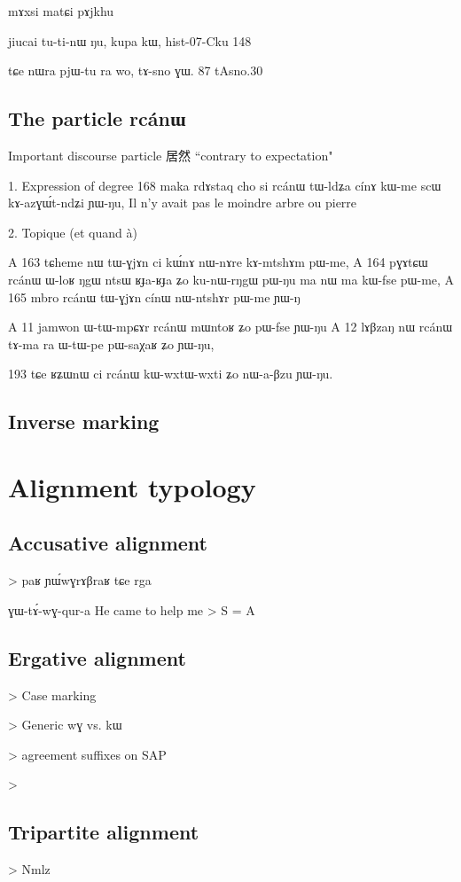 \documentclass[oldfontcommands,oneside,a4paper,11pt]{memoir}
\newcommand{\ipa}[1]{{\phon #1}} %
\newcommand{\wav}[1]{}%
\begin{document}
mɤxsi matɕi pɤjkhu
\wav{mAxsi}

jiucai tu-ti-nɯ ŋu, kupa kɯ,
hist-07-Cku
148

tɕe nɯra pjɯ-tu ra wo, tɤ-sno ɣɯ.
87 tAsno.30
\section{The particle \ipa{rcánɯ}}
Important discourse particle
居然 ``contrary to expectation"

1. Expression of degree
168	maka	rdɤstaq	cho	si	rcánɯ	tɯ-ldʑa	cínɤ	kɯ-me	scɯ	kɤ-azɣɯ́t-ndʑi	ɲɯ-ŋu,
Il n'y avait pas le moindre arbre ou pierre


2. Topique (et quand à)

A	163	tɕheme	nɯ	tɯ-ɣjɤn	ci	kɯ́nɤ	nɯ-nɤre	kɤ-mtshɤm	pɯ-me,
A	164	pɣɤtɕɯ	rcánɯ	ɯ-loʁ	ŋgɯ	ntsɯ	ʁɟa-ʁɟa	ʑo	ku-nɯ-rŋgɯ	pɯ-ŋu	ma	nɯ	ma	kɯ-fse	pɯ-me,
A	165	mbro	rcánɯ	tɯ-ɣjɤn	cínɯ	nɯ-ntshɤr	pɯ-me	ɲɯ-ŋ


A	11	  jamwon ɯ-tɯ-mpɕɤr rcánɯ mɯntoʁ ʑo pɯ-fse ɲɯ-ŋu
A	12	lɤβzaŋ nɯ rcánɯ tɤ-ma ra ɯ-tɯ-pe pɯ-saχaʁ ʑo ɲɯ-ŋu,



193	tɕe	ʁʑɯnɯ	ci	rcánɯ	kɯ-wxtɯ-wxti	ʑo	nɯ-a-βzu	ɲɯ-ŋu.

 \section{Inverse marking} \label{sec:inverse.discourse}

\chapter{Alignment typology}

\section{Accusative alignment}

> paʁ ɲɯ́wɣrɤβraʁ tɕe rga

ɣɯ-tɤ́-wɣ-qur-a 
He came to help me > S = A \wav{8_GWtAwGqura}
\section{Ergative alignment}
> Case marking

> Generic wɣ vs. kɯ

> agreement suffixes on SAP

> 


\section{Tripartite alignment}
> Nmlz
\end{document}
